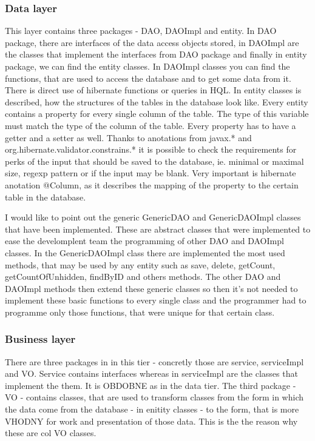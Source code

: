 \documentclass[thesis=B,english]{FITthesis}[2012/10/20]
\begin{document}
\subsubsection{Data layer}
This layer contains three packages - DAO, DAOImpl and entity. In DAO package, there are interfaces of the data access objects stored, in DAOImpl are the classes that implement the interfaces from DAO package and finally in entity package, we can find the entity classes.
In DAOImpl classes you can find the functions, that are used to access the database and to get some data from it. There is direct use of hibernate functions or queries in HQL.
In entity classes is described, how the structures of the tables in the database look like. Every entity contains a property for every single column of the table. The type of this variable must match the type of the column of the table. Every property has to have a getter and a setter as well. Thanks to anotations from javax.* and org.hibernate.validator.constrains.* it is possible to check the requirements for perks of the input that should be saved to the database, ie. minimal or maximal size, regexp pattern or if the input may be blank. Very important is hibernate anotation @Column, as it describes the mapping of the property to the certain table in the database.

I would like to point out the generic GenericDAO and GenericDAOImpl classes that have been implemented.
These are abstract classes that were implemented to ease the develomplent team the programming of other DAO and DAOImpl classes. In the GenericDAOImpl class there are implemented the most used methods, that may be used by any entity such as save, delete, getCount, getCountOfUnhidden, findByID and others methods. The other DAO and DAOImpl methods then extend these generic classes so then it's not needed to implement these basic functions to every single class and the programmer had to programme only those functions, that were unique for that certain class.
\subsubsection{Business layer}
There are three packages in in this tier - concretly those are service, serviceImpl and VO. Service contains interfaces whereas in serviceImpl are the classes that implement the them. It is OBDOBNE as in the data tier. The third package - VO - contains classes, that are used to transform classes from the form in which the data come from the database - in enitity classes - to the form, that is more VHODNY for work and presentation of those data. This is the the reason why these are col VO classes.
\end{document}
